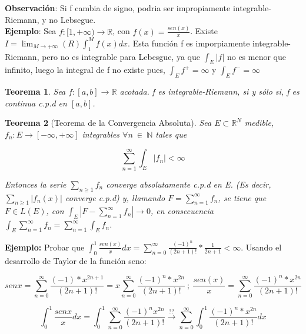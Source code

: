 \documentclass{article}
\newtheorem{theorem}{Teorema}
\begin{document}
\textbf{Observación}: Si f cambia de signo, podria ser impropiamente integrable-Riemann, y no Lebsegue. \\

\textbf{Ejemplo}: Sea $f:[1,+\infty) \rightarrow \mathbb{R}$, con $f(x) = \frac{sen(x)}{x}$. 
Existe $I = \lim_{M \to +\infty} (R)\int_1^M f(x) dx$. Esta función f es imporpiamente integrable-Riemann, pero no es integrable para Lebesgue, ya que $\int_E |f|$ no es menor que infinito, luego la integral de f no existe pues, $\int_E f^+ = \infty$ y $\int_E f^-= \infty$

\begin{theorem}
Sea $f: [a,b] \rightarrow \mathbb{R}$ acotada. f es integrable-Riemann, si y sólo si, f es continua c.p.d en $[a,b]$. 
\end{theorem}

\begin{theorem}[Teorema de la Convergencia Absoluta]
Sea $E \subset \mathbb{R}^N$ medible, $f_n:E \rightarrow [-\infty, + \infty]$ integrables $\forall n \> \in \> \mathbb{N}$ tales que 

\begin{equation*}
\sum_{n=1}^\infty \int_E |f_n| < \infty
\end{equation*}

Entonces la serie $\sum_{n \geq 1} f_n$ converge absolutamente c.p.d en E. (Es decir, $\sum_{n\geq 1} |f_n(x)|$ converge c.p.d)  y, llamando $F= \sum_{n=1}^\infty f_n$, se tiene que $F \in L(E)$, con $\int_E |F - \sum_{n=1}^\infty f_n| \rightarrow 0$, en consecuencia $\int_E \sum_{n=1}^\infty f_n = \sum_{n=1}^\infty \int_E f_n$.\\
\end{theorem}

\textbf{Ejemplo:} Probar que $\int_0^1 \frac{sen(x)}{x} dx = \sum_{n=0}^\infty \frac{(-1)^n}{(2n+1)!}*\frac{1}{2n+1} < \infty$. Usando el desarrollo de Taylor de la función seno: 

\begin{equation*}
sen x = \sum_{n=0}^\infty \frac{(-1)*x^{2n+1}}{(2n+1)!}=x\sum_{n=0}^\infty \frac{(-1)^n*x^{2n}}{(2n+1)!} \>; \> \frac{sen(x)}{x}=\sum_{n=0}^\infty \frac{(-1)^n*x^{2n}}{(2n+1)!}
\end{equation*}

\begin{equation*}
\int_0^1 \frac{sen x}{x} dx = \int_0^1 \sum_{n=0}^\infty \frac{(-1)^n x^{2n}}{(2n+1)!} \xrightarrow{??} \sum_{n=0}^\infty \int_0^1 \frac{(-1)^n*x^{2n}}{(2n+1)!}dx
\end{equation*}
\end{document}
